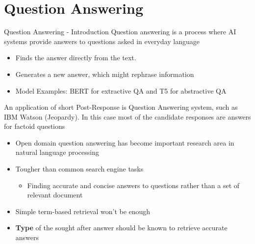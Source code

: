 
\section{Question Answering}


\begin{frame}{Question Answering - Introduction }
Question answering is a process where AI systems provide answers to questions asked in everyday language\\
\begin{itemize}
\item {} Finds the answer directly from the text.
\item {} Generates a new answer, which might rephrase information
\item Model Examples: BERT for extractive QA and T5 for abstractive QA
\end{itemize}

\end{frame}
\begin{frame}
An application of short Post-Response is Question Answering system, such as IBM Watson (Jeopardy).
In this case most of the candidate responses are answers for factoid questions
\begin{itemize}
	\item Open domain  question  answering  has become important research area in natural language processing
	\item Tougher than  common  search  engine  tasks
	\begin{itemize}
		\item Finding accurate and concise answers  to  questions rather  than  a  set of relevant  document
	\end{itemize}
	\item Simple term-based retrieval won't be enough
	\item \textbf{Type} of the sought after answer should be known to retrieve accurate answers
\end{itemize}

\end{frame}


